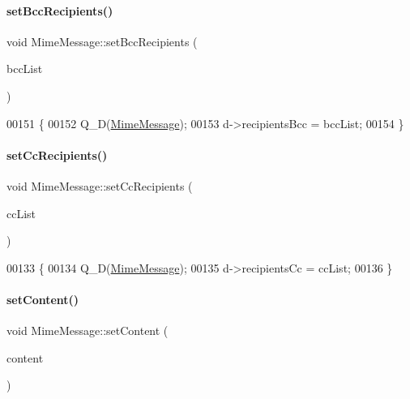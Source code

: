 \paragraph{\texorpdfstring{set\+Bcc\+Recipients()}{setBccRecipients()}}
{\footnotesize\ttfamily void Mime\+Message\+::set\+Bcc\+Recipients (\begin{DoxyParamCaption}\item[{const Q\+List$<$ \hyperlink{class_simple_mail_1_1_email_address}{Email\+Address} $>$ \&}]{bcc\+List }\end{DoxyParamCaption})}


\begin{DoxyCode}
00151 \{
00152     Q\_D(\hyperlink{class_simple_mail_1_1_mime_message}{MimeMessage});
00153     d->recipientsBcc = bccList;
00154 \}
\end{DoxyCode}
\mbox{\label{class_simple_mail_1_1_mime_message_afc2867c3922e5d3766ff46168799285f}} 
\paragraph{\texorpdfstring{set\+Cc\+Recipients()}{setCcRecipients()}}
{\footnotesize\ttfamily void Mime\+Message\+::set\+Cc\+Recipients (\begin{DoxyParamCaption}\item[{const Q\+List$<$ \hyperlink{class_simple_mail_1_1_email_address}{Email\+Address} $>$ \&}]{cc\+List }\end{DoxyParamCaption})}


\begin{DoxyCode}
00133 \{
00134     Q\_D(\hyperlink{class_simple_mail_1_1_mime_message}{MimeMessage});
00135     d->recipientsCc = ccList;
00136 \}
\end{DoxyCode}
\mbox{\label{class_simple_mail_1_1_mime_message_a489178b096474e20dc068168df42ab15}} 
\paragraph{\texorpdfstring{set\+Content()}{setContent()}}
{\footnotesize\ttfamily void Mime\+Message\+::set\+Content (\begin{DoxyParamCaption}\item[{\hyperlink{class_simple_mail_1_1_mime_part}{Mime\+Part} $\ast$}]{content }\end{DoxyParamCaption})}


